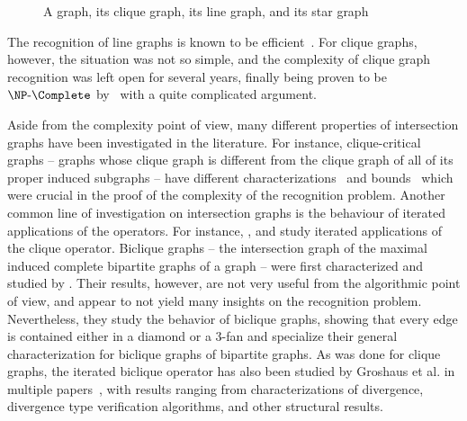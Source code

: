 \begin{figure}[!htb]
    \hfill
    \hfill
    \caption{A graph, its clique graph, its line graph, and its star graph}
    \label{fig:my_label}
\end{figure}

The recognition of line graphs is known to be efficient~\citep{line_dynamic,line_nich,line_naor}.
For clique graphs, however, the situation was not so simple, and the complexity of clique graph recognition was left open for several years, finally being proven to be $\NPc$ by~\cite{clique_recognition} with a quite complicated argument.

Aside from the complexity point of view, many different properties of intersection graphs have been investigated in the literature.
For instance, clique-critical graphs -- graphs whose clique graph is different from the clique graph of all of its proper induced subgraphs -- have different characterizations~\citep{clique_critical_toft} and bounds~\citep{clique_critical_alcon} which were crucial in the proof of the complexity of the recognition problem.
Another common line of investigation on intersection graphs is the behaviour of iterated applications of the operators.
For instance, \cite{clique_iterated}, and \cite{clique_divergent} study iterated applications of the clique operator.
Biclique graphs -- the intersection graph of the maximal induced complete bipartite graphs of a graph -- were first characterized and studied by \cite{biclique_graph}.
Their results, however, are not very useful from the algorithmic point of view, and appear to not yield many insights on the recognition problem.
Nevertheless, they study the behavior of biclique graphs, showing that every edge is contained either in a diamond or a 3-fan and specialize their general characterization for biclique graphs of bipartite graphs.
As was done for clique graphs, the iterated biclique operator has also been studied by Groshaus et al. in multiple papers~\citep{biclique_iterated, almost_all_biclique}, with results ranging from characterizations of divergence, divergence type verification algorithms, and other structural results.

